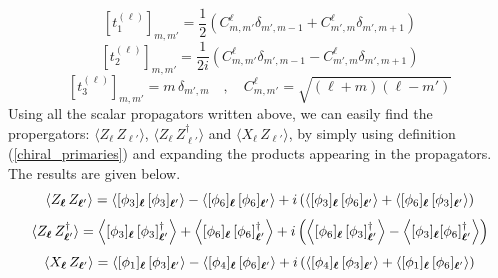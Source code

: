 \newpage
%
%
\begin{equation}\label{so(3) generators 1}
[t^{(\ell)}_1]_{m,m'}
=
\frac{1}{2} \left(
C^\ell_{m,m'} \delta_{m',m-1}
+ 
C^\ell_{m',m} \delta_{m',m+1}
\right)
\end{equation}
%
%
\begin{equation}\label{so(3) generators 2}
[t^{(\ell)}_2]_{m,m'}
=
\frac{1}{2 i} \left(
C^\ell_{m,m'} \delta_{m',m-1}
- 
C^\ell_{m',m} \delta_{m',m+1}
\right)
\end{equation}
%
%
\begin{equation}\label{so(3) generators 3}
[t^{(\ell)}_3]_{m,m'}
=
m \, \delta_{m',m}
%
\quad , \quad
%
C^\ell_{m,m'} = \sqrt{(\ell+m)(\ell-m')}
\end{equation}
%
%
Using all the scalar propagators written above, we can easily find the propergators: $\langle Z_{\boldsymbol{\ell}} \, Z_{\boldsymbol{\ell}'} \rangle$, $\langle Z_{\boldsymbol{\ell}} \, Z^\dagger_{\boldsymbol{\ell}'} \rangle$ and $\langle X_{\boldsymbol{\ell}} \, Z_{\boldsymbol{\ell}'} \rangle$, by simply using definition (\ref{chiral_primaries}) and expanding the products appearing in the propagators. The results are given below.
%
%
\begin{equation}
\langle
Z_{\boldsymbol{\ell}} \, Z_{\boldsymbol{\ell}'}
\rangle
=
\expval{
[\phi_3]_{\boldsymbol{\ell}} \,
[\phi_3]_{\boldsymbol{\ell}'}
}
- \expval{
[\phi_6]_{\boldsymbol{\ell}} \,
[\phi_6]_{\boldsymbol{\ell}'}
}
+ i \left(
\expval{
[\phi_3]_{\boldsymbol{\ell}} \,
[\phi_6]_{\boldsymbol{\ell}'}
}
+
\expval{
[\phi_6]_{\boldsymbol{\ell}} \,
[\phi_3]_{\boldsymbol{\ell}'}
}
\right)
\end{equation}
%
%
\begin{equation}
\langle
Z_{\boldsymbol{\ell}} \, Z^\dagger_{\boldsymbol{\ell}'}
\rangle
=
\expval{
[\phi_3]_{\boldsymbol{\ell}} \,
[\phi_3]^\dagger_{\boldsymbol{\ell}'}
}
+
\expval{
[\phi_6]_{\boldsymbol{\ell}} \,
[\phi_6]^\dagger_{\boldsymbol{\ell}'}
}
+ i \left(
\expval{
[\phi_6]_{\boldsymbol{\ell}} \,
[\phi_3]^\dagger_{\boldsymbol{\ell}'}
}
-
\expval{
[\phi_3]_{\boldsymbol{\ell}}
[\phi_6]^\dagger_{\boldsymbol{\ell}'}
}
\right)
\end{equation}
%
%
\begin{equation}
\langle
X_{\boldsymbol{\ell}} \, Z_{\boldsymbol{\ell}'}
\rangle
=
\expval{
[\phi_1]_{\boldsymbol{\ell}} \,
[\phi_3]_{\boldsymbol{\ell}'}
}
-
\expval{
[\phi_4]_{\boldsymbol{\ell}} \,
[\phi_6]_{\boldsymbol{\ell}'}
}
+ i \left(
\expval{
[\phi_4]_{\boldsymbol{\ell}} \,
[\phi_3]_{\boldsymbol{\ell}'}
}
+
\expval{
[\phi_1]_{\boldsymbol{\ell}} \,
[\phi_6]_{\boldsymbol{\ell}'}
}
\right)
\end{equation}
